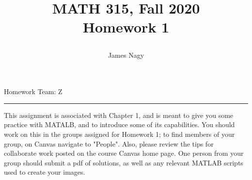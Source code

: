\documentclass[12pt]{article}
\title{MATH 315, Fall 2020 \\[3pt]
Homework 1 
\date{}}
\author{James Nagy}
\begin{document}
\maketitle

\begin{center}
Homework Team: Z \\
\rule[0pt]{12cm}{1pt}
\end{center}


This assignment is associated with Chapter 1, and is meant to give you some practice with MATALB, and to introduce some of its capabilities. 
You should work on this in the groups assigned for Homework 1; to find members of your group, on Canvas navigate to "People".  Also, please review the tips for collaborate work posted on the course Canvas home page. One person from your group should submit a pdf of solutions, as well as any relevant MATLAB scripts used to create your images. 
\end{document}
